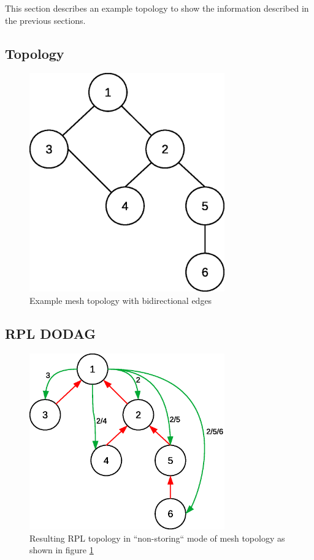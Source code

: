 \documentclass[letterpaper]{article}
\begin{document}
This section describes an example topology to show the information described in the previous sections.

\subsection{Topology}

\begin{figure}[h]
	\includegraphics[width=3.31in]{figs/mesh0.eps}
	\caption{Example mesh topology with bidirectional edges}
	\label{mesh0}
\end{figure}

\subsection{RPL DODAG}

\begin{figure}[h]
	\includegraphics[width=3.31in]{figs/mesh1.eps}
	\caption{Resulting RPL topology in ``non-storing`` mode of mesh topology as shown in figure \ref{mesh0}}
	\label{mesh1}
\end{figure}
\end{document}

